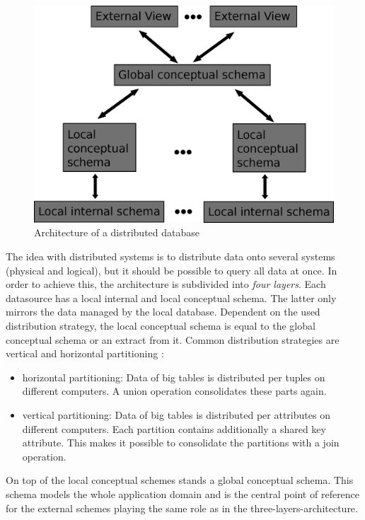 \begin{figure}[H]
	\begin{center}
		\includegraphics[scale=0.5]{figures/distributedDatabaseArchitecture.png}
	\end{center}
	\caption{Architecture of a distributed database \cite[p. 92]{DBLP:books/dp/LeserN2006}}
	\label{DistributedDatabaseArchitecture}
\end{figure}


The idea with distributed systems is to distribute data onto several systems (physical and logical), but it should be possible to query all data at once. In order to achieve this, the architecture is subdivided into \textit{four layers}. Each datasource has a local internal and local conceptual schema. The latter only mirrors the data managed by the local database. Dependent on the used distribution strategy, the local conceptual schema is equal to the global conceptual schema  or an extract from it. Common distribution strategies are vertical and horizontal partitioning \cite[p. 92]{DBLP:books/dp/LeserN2006}: 
\begin{itemize}
\item horizontal partitioning: Data of big tables is distributed per tuples on different computers. A union operation consolidates these parts again.
\item vertical partitioning: Data of big tables is distributed per attributes on different computers. Each partition contains additionally a shared key attribute. This makes it possible to consolidate the partitions with a join operation.
\end{itemize}
On top of the local conceptual schemes stands a global conceptual schema. This schema models the whole application domain and is the central point of reference for the external schemes playing the same role as in the three-layers-architecture.

